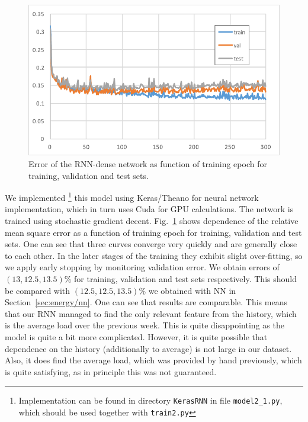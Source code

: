 \documentclass{article} %
\begin{document}
\begin{figure}[h]
\begin{center}
\includegraphics[width=0.70\linewidth]{energy_RNN_learning.pdf}	
\end{center}
\caption{Error of the RNN-dense network as function of training epoch for 
training, validation and test sets.}
\label{fig:energy/rnn_learn}
\end{figure}
We implemented%
\footnote{
Implementation can be found in directory {\tt KerasRNN} in 
file {\tt  model2\_1.py},
which should be used together with {\tt train2.py}
}
this model using Keras/Theano for neural network implementation, which in turn 
uses Cuda for GPU calculations. The network is trained using stochastic 
gradient decent.
Fig.~\ref{fig:energy/rnn_learn} shows dependence of the relative 
mean square error as a function of training epoch for training, validation 
and test sets. One can see that three curves converge very quickly and
are generally close to each other. In the later stages of the training they
exhibit slight over-fitting, so we apply early stopping by monitoring
validation error. We obtain errors of $(13,12.5,13.5)\%$ for training,
validation and test sets respectively.
This should be compared with  $(12.5,12.5,13.5)\%$ we obtained
with NN in Section~\ref{sec:energy/nn}. One can see that results are comparable.
This means that our RNN managed to find the only relevant feature from the history,
which is the average load over the previous week.
This is quite disappointing as the model is quite a bit more complicated.
However, it is quite possible that dependence on the history 
(additionally to average) is not large in our dataset.
Also, it does find the average load, which was provided by hand previously,
which is quite satisfying, as in principle this was not guaranteed.
\end{document}
